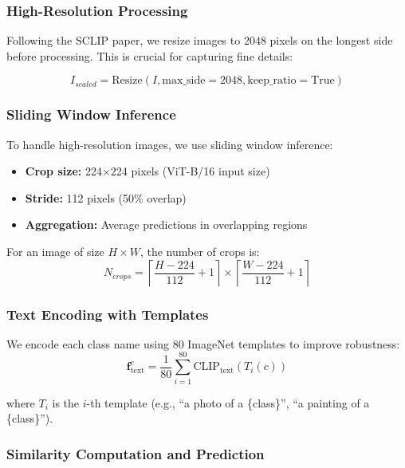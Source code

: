 \subsubsection{High-Resolution Processing}

Following the SCLIP paper, we resize images to 2048 pixels on the longest side before processing. This is crucial for capturing fine details:

\begin{equation}
I_{scaled} = \text{Resize}\left(I, \text{max\_side}=2048, \text{keep\_ratio}=\text{True}\right)
\end{equation}

\subsubsection{Sliding Window Inference}

To handle high-resolution images, we use sliding window inference:
\begin{itemize}
    \item \textbf{Crop size:} 224×224 pixels (ViT-B/16 input size)
    \item \textbf{Stride:} 112 pixels (50\% overlap)
    \item \textbf{Aggregation:} Average predictions in overlapping regions
\end{itemize}

For an image of size $H \times W$, the number of crops is:
\begin{equation}
N_{crops} = \left\lceil \frac{H - 224}{112} + 1 \right\rceil \times \left\lceil \frac{W - 224}{112} + 1 \right\rceil
\end{equation}

\subsubsection{Text Encoding with Templates}

We encode each class name using 80 ImageNet templates to improve robustness:
\begin{equation}
\mathbf{f}_{\text{text}}^c = \frac{1}{80} \sum_{i=1}^{80} \text{CLIP}_{\text{text}}(T_i(c))
\end{equation}

where $T_i$ is the $i$-th template (e.g., ``a photo of a \{class\}'', ``a painting of a \{class\}'').

\subsubsection{Similarity Computation and Prediction}

